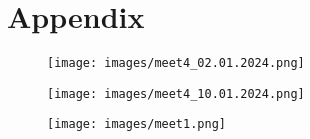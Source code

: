 \documentclass[12pt]{article}
\begin{document}


	\newpage
	\section{Appendix}
	\begin{figure}[H]
	\centering
	\label{Meeting4}
	\texttt{[image: images/meet4\_02.01.2024.png]}\\[0.5 cm]
				
\end{figure}
	\begin{figure}[H]
	\centering
	\label{Meeting5}
	\texttt{[image: images/meet4\_10.01.2024.png]}\\[0.5 cm]			
\end{figure}
	\begin{figure}[H]
	\centering
	\label{Meeting3}
	\texttt{[image: images/meet1.png]}\\[0.5 cm]			
\end{figure}
	
	
\end{document}
